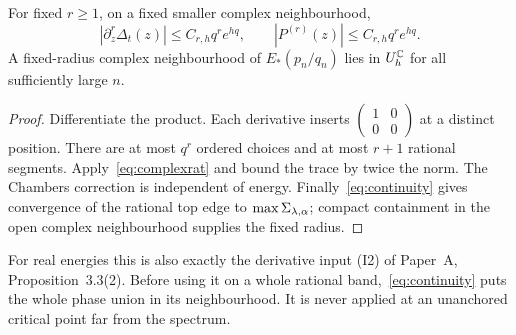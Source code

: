 \begin{corollary}\label{cor:derivatives}
For fixed $r\ge1$, on a fixed smaller complex neighbourhood,
\[
 |\partial_z^r\Delta_t(z)|\le C_{r,h}q^re^{hq},\qquad
 |P^{(r)}(z)|\le C_{r,h}q^re^{hq}.
\]
A fixed-radius complex neighbourhood of $E_*(p_n/q_n)$ lies in $U_h^{\mathbb C}$ for all sufficiently large $n$.
\end{corollary}
\begin{proof}
Differentiate the product. Each derivative inserts $\left(\begin{smallmatrix}1&0\\0&0\end{smallmatrix}\right)$ at a distinct position. There are at most $q^r$ ordered choices and at most $r+1$ rational segments. Apply~\eqref{eq:complexrat} and bound the trace by twice the norm. The Chambers correction is independent of energy. Finally~\eqref{eq:continuity} gives convergence of the rational top edge to $\max\Sigma_{\lambda,\alpha}$; compact containment in the open complex neighbourhood supplies the fixed radius.
\end{proof}

For real energies this is also exactly the derivative input (I2) of Paper~A, Proposition~3.3(2). Before using it on a whole rational band,~\eqref{eq:continuity} puts the whole phase union in its neighbourhood. It is never applied at an unanchored critical point far from the spectrum.

\label{end:complex}
